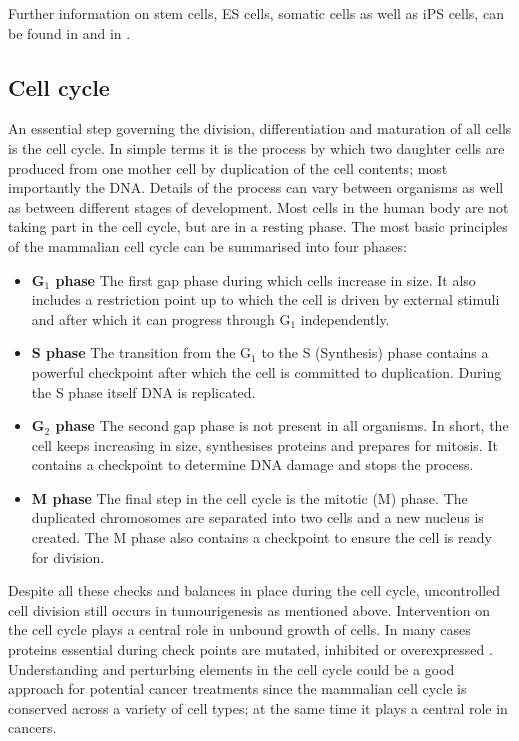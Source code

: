 Further information on stem cells, ES cells, somatic cells as well as iPS cells, can be found in \cite{lanza2009essentials} and in \cite{Lanza:2013uk}.

\subsection{Cell cycle}
\label{sec:cell-cycle}

An essential step governing the division, differentiation and maturation of all cells is the cell cycle. In simple terms it is the process by which two daughter cells are produced from one mother cell by duplication of the cell contents; most importantly the DNA. Details of the process can vary between organisms as well as between different stages of development. Most cells in the human body are not taking part in the cell cycle, but are in a resting phase. The most basic principles of the mammalian cell cycle can be summarised into four phases:

\begin{itemize}
\item {\bf G$_1$ phase} The first gap phase during which cells increase in size. It also includes a restriction point up to which the cell is driven by external stimuli and after which it can progress through G$_1$ independently.
\item {\bf S phase} The transition from the G$_1$ to the S (Synthesis) phase contains a powerful checkpoint after which the cell is committed to duplication. During the S phase itself DNA is replicated.
\item {\bf G$_2$ phase} The second gap phase is not present in all organisms. In short, the cell keeps increasing in size, synthesises proteins and prepares for mitosis. It contains a checkpoint to determine DNA damage and stops the process.
\item {\bf M phase} The final step in the cell cycle is the mitotic (M) phase. The duplicated chromosomes are separated into two cells and a new nucleus is created. The M phase also contains a checkpoint to ensure the cell is ready for division.
\end{itemize}

Despite all these checks and balances in place during the cell cycle, uncontrolled cell division  still occurs in tumourigenesis as mentioned above. Intervention on the cell cycle plays a central role in unbound growth of cells. In many cases proteins essential during check points are mutated, inhibited or overexpressed \citep{Williams:2012eg}. Understanding and perturbing elements in the cell cycle could be a good approach for potential cancer treatments since the mammalian cell cycle is conserved across a variety of cell types; at the same time it plays a central role in cancers.

